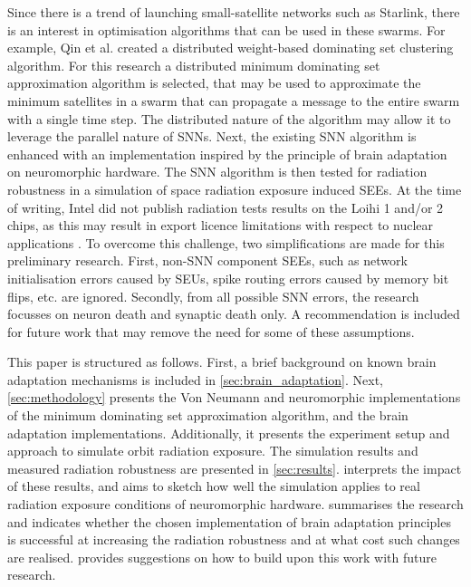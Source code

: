 Since there is a trend of launching small-satellite networks such as Starlink, there is an interest in optimisation algorithms that can be used in these swarms. For example, Qin et al. created a distributed weight-based dominating set clustering algorithm\cite{qin2012weight}.
For this research a distributed minimum dominating set approximation algorithm is selected, that may be used to approximate the minimum satellites in a swarm that can propagate a message to the entire swarm with a single time step. The distributed nature of the algorithm may allow it to leverage the parallel nature of SNNs.
Next, the existing SNN algorithm is enhanced with an implementation inspired by the principle of brain adaptation on neuromorphic hardware. The SNN algorithm is then tested for radiation robustness in a simulation of space radiation exposure induced SEEs. At the time of writing, Intel did not publish radiation tests results on the Loihi 1 and/or 2 chips, as this may result in export licence limitations with respect to nuclear applications \cite{inrc_meeting}. To overcome this challenge, two simplifications are made for this preliminary research. First, non-SNN component SEEs, such as network initialisation errors caused by SEUs, spike routing errors caused by memory bit flips, etc. are ignored. Secondly, from all possible SNN errors, the research focusses on neuron death and synaptic death only. A recommendation is included for future work that may remove the need for some of these assumptions. %

This paper is structured as follows. First, a brief background on known brain adaptation mechanisms is included in \cref{sec:brain_adaptation}. Next, \cref{sec:methodology} presents the Von Neumann and neuromorphic implementations of the minimum dominating set approximation algorithm, and the brain adaptation implementations. Additionally, it presents the experiment setup and approach to simulate orbit radiation exposure. The simulation results and measured radiation robustness are presented in \cref{sec:results}.  interprets the impact of these results, and aims to sketch how well the simulation applies to real radiation exposure conditions of neuromorphic hardware.  summarises the research and indicates whether the chosen implementation of brain adaptation principles is successful at increasing the radiation robustness and at what cost such changes are realised.  provides suggestions on how to build upon this work with future research. %